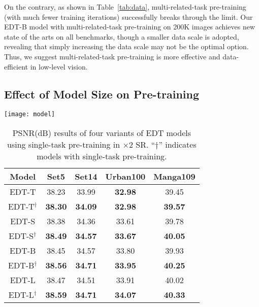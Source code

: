 \documentclass[runningheads]{llncs}
\begin{document}
	On the contrary, as shown in Table~\ref{tab:data}, multi-related-task pre-training (with much fewer training iterations) successfully breaks through the limit. Our EDT-B model with multi-related-task pre-training on 200K images achieves new state of the arts on all benchmarks, though a smaller data scale is adopted, revealing that simply increasing the data scale may not be the optimal option. Thus, we suggest multi-related-task pre-training is more effective and data-efficient in low-level vision.
	


	\subsection{Effect of Model Size on Pre-training}
	
	\begin{table}[t]
		\begin{minipage}[c]{0.49\linewidth}
			\centering
			\texttt{[image: model]}
			\label{fig:model}
		\end{minipage}\hfill
		\begin{minipage}[c]{0.49\linewidth}
			\centering
			\caption{PSNR(dB) results of four variants of EDT models using single-task pre-training in $\times 2$ SR. ``$\dagger$'' indicates models with single-task pre-training.}
			\renewcommand\arraystretch{1.2}
			\begin{tabular}{| c | c c c c |}
				\hline
				Model & Set5 & Set14 & Urban100 & Manga109 \\
				\hline
				EDT-T & 38.23 & 33.99 & \textbf{32.98} & 39.45 \\
				EDT-T$^\dagger$ & \textbf{38.30} & \textbf{34.09} & \textbf{32.98} & \textbf{39.57} \\		
				\hline
				EDT-S & 38.38 & 34.36 & 33.61 & 39.78 \\
				EDT-S$^\dagger$ & \textbf{38.49} & \textbf{34.57} & \textbf{33.67} & \textbf{40.05} \\
				\hline
				EDT-B & 38.45 & 34.57 & 33.80 & 39.93 \\
				EDT-B$^\dagger$ & \textbf{38.56} & \textbf{34.71} & \textbf{33.95} & \textbf{40.25 }\\
				\hline
				EDT-L & 38.47 & 34.51 & 33.91 & 40.02 \\
				EDT-L$^\dagger$ & \textbf{38.59} & \textbf{34.71} & \textbf{34.07} & \textbf{40.33} \\
				\hline
			\end{tabular}
			\vspace{0.05in}
			\label{tab:model}
		\end{minipage}
		\vspace{-0.2in}
	\end{table}
	
\end{document}

